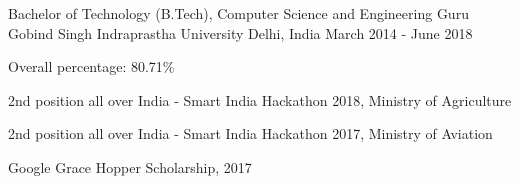 \begin{cventries}
  \cventry
    {Bachelor of Technology (B.Tech), Computer Science and Engineering} %
    {Guru Gobind Singh Indraprastha University} %
    {Delhi, India} %
    {March 2014 - June 2018} %
    {
      \begin{cvitems} %
        \item {Overall percentage: 80.71\%}
        \item {2nd position all over India - Smart India Hackathon 2018, Ministry of Agriculture}
        \item {2nd position all over India - Smart India Hackathon 2017, Ministry of Aviation}
        \item {Google Grace Hopper Scholarship, 2017}
      \end{cvitems}
    }

\end{cventries}